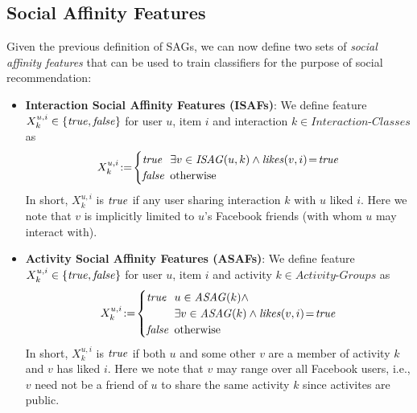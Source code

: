 \subsection{Social Affinity Features}

\label{ssec:SAfeature}

Given the previous definition of SAGs, we can now define two
sets of \emph{social affinity features} that can be used to train
classifiers for the purpose of social recommendation:

\begin{itemize} 
\item \textbf{Interaction Social Affinity Features (ISAFs)}: 
We define feature $X^{u,i}_k \in \{ \true, \false \}$ for user $u$, item $i$ and interaction
$k \in \textit{Interaction-Classes}$ as
  \begin{equation*}
   X^{u,i}_{k} \! := \!
      \begin{cases}
   		\true  \!\!\! & \exists v \in \mathit{ISAG}(u,k) \wedge \likes(v,i)\!=\!\true\\ 
   		\false \!\!\! & \text{otherwise}
      \end{cases}
  \end{equation*}
   In short, $X^{u,i}_{k}$ is $\true$ if any user sharing interaction $k$ with $u$ liked $i$.
   Here we note that $v$ is implicitly limited to $u$'s Facebook friends (with whom $u$
   may interact with).
\item \textbf{Activity Social Affinity Features (ASAFs)}: 
We define feature $X^{u,i}_k \in \{ \true, \false \}$ for user $u$, item $i$ and activity
$k \in \textit{Activity-Groups}$ as
  \begin{equation*}
   X^{u,i}_{k} \! := \! 
      \begin{cases}
   		\true  \!\!\! & u \in \mathit{ASAG}(k) \wedge \\
                              & \exists v \in \mathit{ASAG}(k) \wedge \likes(v,i)\!=\!\true\\
   		\false \!\!\! & \text{otherwise}
      \end{cases}
  \end{equation*}
  In short, $X^{u,i}_{k}$ is $\true$ if both $u$ and some other $v$ are a member of activity $k$
  and $v$ has liked $i$.  Here we note that $v$ may range over all Facebook users, 
  i.e., $v$ need not be a friend of $u$ to share the same activity $k$
  since activites are public.
\end{itemize}



